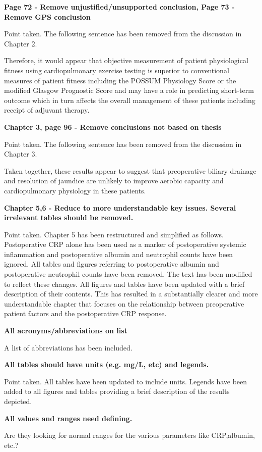 \documentclass[12pt,a4paper]{article}
\begin{document}
\textbf{Page 72 - Remove unjustified/unsupported conclusion, Page 73 - Remove GPS conclusion}
	
	Point taken. The following sentence has been removed from the discussion in Chapter 2.
	
	Therefore, it would appear that objective measurement of patient physiological fitness using cardiopulmonary exercise testing is superior to conventional measures of patient fitness including the POSSUM Physiology Score or the modified Glasgow Prognostic Score and may have a role in predicting short-term outcome which in turn affects the overall management of these patients including receipt of adjuvant therapy.
	
\textbf{Chapter 3, page 96 - Remove conclusions not based on thesis}
	
	Point taken. The following sentence has been removed from the discussion in Chapter 3.
	
	Taken together, these results appear to suggest that preoperative biliary drainage and resolution of jaundice are unlikely to improve aerobic capacity and cardiopulmonary physiology in these patients.
	
\textbf{Chapter 5,6 - Reduce to more understandable key issues. Several irrelevant tables should be removed.}

	Point taken. 
	Chapter 5 has been restructured and simplified as follows. 
	Postoperative CRP alone has been used as a marker of postoperative systemic inflammation and postoperative albumin and neutrophil counts have been ignored.
	All tables and figures referring to postoperative albumin and postoperative neutrophil counts have been removed. 
	The text has been modified to reflect these changes. 
	All figures and tables have been updated with a brief description of their contents. 
	This has resulted in a substantially clearer and more understandable chapter that focuses on the relationship between preoperative patient factors and the postoperative CRP response.
	
\textbf{All acronyms/abbreviations on list}
	
	A list of abbreviations has been included.
	
\textbf{All tables should have units (e.g. mg/L, etc) and legends.}
	
	Point taken. 
	All tables have been updated to include units. 
	Legends have been added to all figures and tables providing a brief description of the results
	depicted.
	
\textbf{All values and ranges need defining.}
	
	Are they looking for normal ranges for the various parameters like CRP,albumin, etc.?
\end{document}
